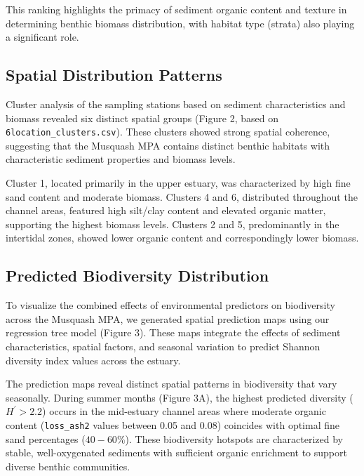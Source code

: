 \documentclass[12pt]{article}
\begin{document}
\qquad This ranking highlights the primacy of sediment organic content and texture in determining benthic biomass distribution, with habitat type (strata) also playing a significant role.

\subsection{Spatial Distribution Patterns}

\qquad Cluster analysis of the sampling stations based on sediment characteristics and biomass revealed six distinct spatial groups (Figure 2, based on \texttt{6location\_clusters.csv}). These clusters showed strong spatial coherence, suggesting that the Musquash MPA contains distinct benthic habitats with characteristic sediment properties and biomass levels.


\qquad Cluster 1, located primarily in the upper estuary, was characterized by high fine sand content and moderate biomass. Clusters 4 and 6, distributed throughout the channel areas, featured high silt/clay content and elevated organic matter, supporting the highest biomass levels. Clusters 2 and 5, predominantly in the intertidal zones, showed lower organic content and correspondingly lower biomass.

\subsection{Predicted Biodiversity Distribution}

\qquad To visualize the combined effects of environmental predictors on biodiversity across the Musquash MPA, we generated spatial prediction maps using our regression tree model (Figure 3). These maps integrate the effects of sediment characteristics, spatial factors, and seasonal variation to predict Shannon diversity index values across the estuary.


\qquad The prediction maps reveal distinct spatial patterns in biodiversity that vary seasonally. During summer months (Figure 3A), the highest predicted diversity ($H^{\prime} > 2.2$) occurs in the mid-estuary channel areas where moderate organic content (\texttt{loss\_ash2} values between 0.05 and 0.08) coincides with optimal fine sand percentages ($40-60\%$). These biodiversity hotspots are characterized by stable, well-oxygenated sediments with sufficient organic enrichment to support diverse benthic communities.
\end{document}
